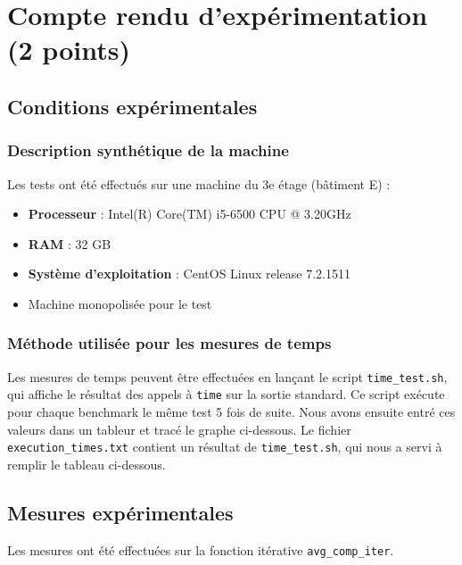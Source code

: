 \documentclass[a4paper, 10pt, french]{article}
\begin{document}
\section{Compte rendu d'expérimentation (2 points)}
  \subsection{Conditions expérimentales}
	\subsubsection{Description synthétique de la machine} 
		Les tests ont été effectués sur une machine du 3e étage (bâtiment E) : 
	  \begin{itemize}
		  \item \textbf{Processeur} : Intel(R) Core(TM) i5-6500 CPU @ 3.20GHz
		  \item \textbf{RAM} : 32 GB
		  \item \textbf{Système d'exploitation} : CentOS Linux release 7.2.1511
		  \item Machine monopolisée pour le test
	  \end{itemize}

	\subsubsection{Méthode utilisée pour les mesures de temps} 
	  Les mesures de temps peuvent être effectuées en lançant le script \verb?time_test.sh?, qui affiche le résultat des appels à \verb?time? sur la sortie standard.
	  Ce script exécute pour chaque benchmark le même test 5 fois de suite.
	  Nous avons ensuite entré ces valeurs dans un tableur et tracé le graphe ci-dessous.
	  Le fichier \verb?execution_times.txt? contient un résultat de \verb?time_test.sh?, qui nous a servi à remplir le tableau ci-dessous.
	\newpage
  \subsection{Mesures expérimentales}
	Les mesures ont été effectuées sur la fonction itérative \verb?avg_comp_iter?.
\end{document}
